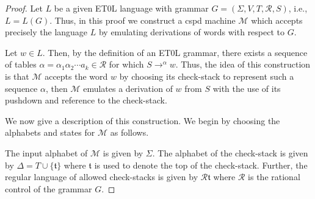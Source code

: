 \begin{proof}
	
	Let $L$ be a given ET0L language with grammar $G = (\Sigma, V, T, \mathcal{R}, S)$, i.e., $L = L(G)$.
	Thus, in this proof we construct a cspd machine $\mathcal{M}$ which accepts precisely the language $L$ by emulating derivations of words with respect to $G$.
	
	Let $w \in L$.
	Then, by the definition of an ET0L grammar, there exists a sequence of tables $\alpha = \alpha_1 \alpha_2 \cdots a_k \in \mathcal{R}$ for which $S \to^\alpha w$.
	Thus, the idea of this construction is that $\mathcal{M}$ accepts the word $w$ by choosing its check-stack to represent such a sequence $\alpha$, then $\mathcal{M}$ emulates a derivation of $w$ from $S$ with the use of its pushdown and reference to the check-stack.
	
	We now give a description of this construction.
	We begin by choosing the alphabets and states for $\mathcal{M}$ as follows.
	
	The input alphabet of $\mathcal{M}$ is given by $\Sigma$.
	The alphabet of the check-stack is given by $\Delta = T \cup \{\mathfrak{t}\}$ where $\mathfrak{t}$ is used to denote the top of the check-stack.
	Further, the regular language of allowed check-stacks is given by $\mathcal{R}\mathfrak{t}$ where $\mathcal{R}$ is the rational control of the grammar $G$.
	

\end{proof}
